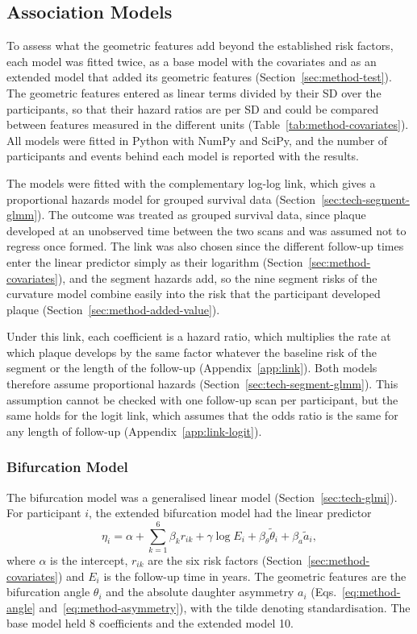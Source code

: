\subsection{Association Models}

To assess what the geometric features add beyond the established risk factors, each model was fitted twice, as a base model with the covariates and as an extended model that added its geometric features (Section~\ref{sec:method-test}).
The geometric features entered as linear terms divided by their SD over the participants, so that their hazard ratios are per SD and could be compared between features measured in the different units (Table~\ref{tab:method-covariates}).
All models were fitted in Python with NumPy and SciPy, and the number of participants and events behind each model is reported with the results.

The models were fitted with the complementary log-log link, which gives a proportional hazards model for grouped survival data (Section~\ref{sec:tech-segment-glmm}).
The outcome was treated as grouped survival data, since plaque developed at an unobserved time between the two scans and was assumed not to regress once formed.
The link was also chosen since the different follow-up times enter the linear predictor simply as their logarithm (Section~\ref{sec:method-covariates}), and the segment hazards add, so the nine segment risks of the curvature model combine easily into the risk that the participant developed plaque (Section~\ref{sec:method-added-value}).

Under this link, each coefficient is a hazard ratio, which multiplies the rate at which plaque develops by the same factor whatever the baseline risk of the segment or the length of the follow-up (Appendix~\ref{app:link}).
Both models therefore assume proportional hazards (Section~\ref{sec:tech-segment-glmm}).
This assumption cannot be checked with one follow-up scan per participant, but the same holds for the logit link, which assumes that the odds ratio is the same for any length of follow-up (Appendix~\ref{app:link-logit}).

\subsubsection{Bifurcation Model}
\label{sec:method-model-spec}

The bifurcation model was a generalised linear model (Section~\ref{sec:tech-glmi}).
For participant $i$, the extended bifurcation model had the linear predictor
\begin{equation}
  \eta_{i} = \alpha + \sum_{k=1}^{6} \beta_k r_{ik} + \gamma \log E_i + \beta_\theta \tilde{\theta}_i + \beta_a \tilde{a}_i ,
  \label{eq:method-lp-bif}
\end{equation}
where $\alpha$ is the intercept, $r_{ik}$ are the six risk factors (Section~\ref{sec:method-covariates}) and $E_i$ is the follow-up time in years.
The geometric features are the bifurcation angle $\theta_i$ and the absolute daughter asymmetry $a_i$ (Eqs.~\eqref{eq:method-angle} and~\eqref{eq:method-asymmetry}), with the tilde denoting standardisation.
The base model held 8 coefficients and the extended model 10.

